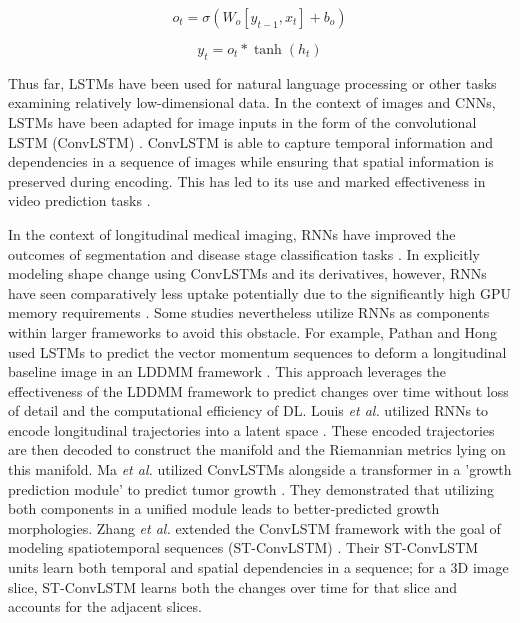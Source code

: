 		\begin{equation}
			o_{t} = \sigma ( W_{o}[y_{t-1}, x_{t}] + b_{o})
			\label{eq:lstmoutput1}
		\end{equation}
		
		\begin{equation}
			y_{t} = o_{t} * \tanh (h_{t})
			\label{eq:lstmoutput2}
		\end{equation}
			
		Thus far, LSTMs have been used for natural language processing or other tasks examining relatively low-dimensional data. In the context of images and CNNs, LSTMs have been adapted for image inputs in the form of the convolutional LSTM (ConvLSTM) \cite{NIPS2015_07563a3f}. ConvLSTM is able to capture temporal information and dependencies in a sequence of images while ensuring that spatial information is preserved during encoding. This has led to its use and marked effectiveness in video prediction tasks \cite{Lotter2016, Lu2017}. 
		
		In the context of longitudinal medical imaging, RNNs have improved the outcomes of segmentation \cite{Gao2018} and disease stage classification tasks \cite{Santeramo2018, Gao2018a, Cui2019, Ouyang2021, Ding2023}. In explicitly modeling shape change using ConvLSTMs and its derivatives, however, RNNs have seen comparatively less uptake potentially due to the significantly high GPU memory requirements \cite{MaZhangLiu22}. Some studies nevertheless utilize RNNs as components within larger frameworks to avoid this obstacle. For example, Pathan and Hong used LSTMs to predict the vector momentum sequences to deform a longitudinal baseline image in an LDDMM framework \cite{SharminYi18}. This approach leverages the effectiveness of the LDDMM framework to predict changes over time without loss of detail and the computational efficiency of DL. Louis \textit{et al.} utilized RNNs to encode longitudinal trajectories into a latent space \cite{Louis2019}. These encoded trajectories are then decoded to construct the manifold and the Riemannian metrics lying on this manifold. Ma \textit{et al.} utilized ConvLSTMs alongside a transformer in a 'growth prediction module' to predict tumor growth \cite{Ma2023}. They demonstrated that utilizing both components in a unified module leads to better-predicted growth morphologies. Zhang \textit{et al.} extended the ConvLSTM framework with the goal of modeling spatiotemporal sequences (ST-ConvLSTM) \cite{Zhang2020}. Their ST-ConvLSTM units learn both temporal and spatial dependencies in a sequence; for a 3D image slice, ST-ConvLSTM learns both the changes over time for that slice and accounts for the adjacent slices. 
		
